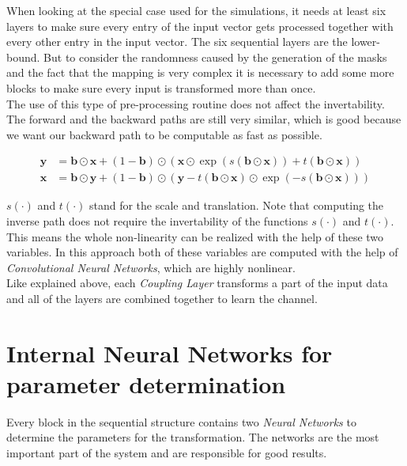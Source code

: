 \documentclass[oneside]{msvreport}%
\newcommand{\B}[1]{\boldsymbol{#1}}
\newcommand{\e}[1]{\emph{#1}}
\begin{document}
\noindent When looking at the special case used for the simulations, it needs at least six layers to make sure every entry of the input vector gets processed together with every other entry in the input vector. The six sequential layers are the lower-bound. But to consider the randomness caused by the generation of the masks and the fact that the mapping is very complex it is necessary to add some more blocks to make sure every input is transformed more than once. \\

\noindent The use of this type of pre-processing routine does not affect the invertability. The forward and the backward paths are still very similar, which is good because we want our backward path to be computable as fast as possible.

\begin{equation}
\begin{split}
  \B{y} & = \B{b} \odot \B{x} + (1-\B{b}) \odot (\B{x} \odot \exp(s(\B{b} \odot \B{x})) + t(\B{b} \odot \B{x})) \\
  \B{x} & = \B{b} \odot \B{y} + (1-\B{b}) \odot (\B{y} - t(\B{b} \odot \B{x}) \odot \exp(-s(\B{b} \odot \B{x})))
\end{split}  
\end{equation}

\noindent $s(\cdot)$ and $t(\cdot)$ stand for the scale and translation. Note that computing the inverse path does not require the invertability of the functions $s(\cdot)$ and $t(\cdot)$. This means the whole non-linearity can be realized with the help of these two variables. In this approach both of these variables are computed with the help of \e{Convolutional Neural Networks}, which are highly nonlinear. \\ Like explained above, each \e{Coupling Layer} transforms a part of the input data and all of the layers are combined together to learn the channel.

\newpage
\section{Internal Neural Networks for parameter determination}
Every block in the sequential structure contains two \e{Neural Networks} to determine the parameters for the transformation. The networks are the most important part of the system and are responsible for good results.\\ 
\end{document}
